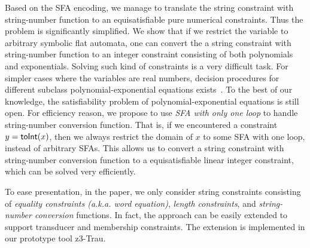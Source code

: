 \documentclass[sigplan,review,anonymous]{acmart}\settopmatter{printfolios=true,printccs=false,printacmref=false}
\begin{document}
Based on the SFA encoding, we manage to translate the string constraint with string-number function to an equisatisfiable pure numerical constraints. Thus the problem is significantly simplified. We show that if we restrict the variable to arbitrary symbolic flat automata, one can convert the a string constraint with string-number function to an integer constraint consisting of both polynomials and exponentials. Solving such kind of constraints is a very difficult task. For simpler cases where the variables are real numbers, decision procedures for different subclass polynomial-exponential equations exists~\cite{gan2015decidability,kincaid2019closed,achatz2008deciding}. To the best of our knowledge, the satisfiability problem of polynomial-exponential equations is still open. For efficiency reason, we propose to use \emph{SFA with only one loop} to handle string-number conversion function. That is, if we encountered a constraint $y=\mbox{\textsf{toInt}($x$)}$, then we always restrict the domain of $x$ to some SFA with one loop, instead of arbitrary SFAs. This allows us to convert a string constraint with string-number conversion function to a equisatisfiable linear integer constraint, which can be solved very efficiently. 



To ease presentation, in the paper, we only consider string constraints consisting of \emph{equality constraints (a.k.a. word equation)}, \emph{length constraints}, and \emph{string-number conversion} functions. In fact, the approach can be easily extended to support transducer and membership constraints. The extension is implemented in our prototype tool \textsf{z3-Trau}. 
\end{document}

